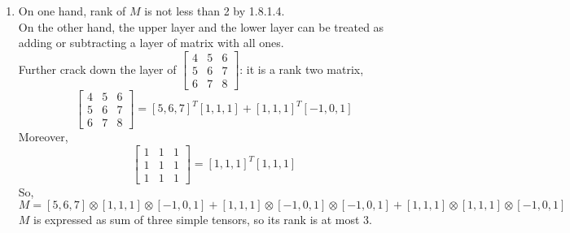 \documentclass{article}
\begin{document}
\begin{enumerate}
    \item 
    On one hand, rank of $M$ is not less than 2 by 1.8.1.4.\\
    On the other hand, the upper layer and the lower layer can be treated as adding or subtracting a layer of matrix with all ones. \\
    Further crack down the layer of 
    $\left[
    \begin{array}{ccc}
     4 & 5 & 6\\
     5 & 6 & 7\\
     6 & 7 & 8
    \end{array}
    \right]$: it is a rank two matrix, 
    \[\left[
    \begin{array}{ccc}
     4 & 5 & 6\\
     5 & 6 & 7\\
     6 & 7 & 8
    \end{array}
    \right] = [5,6,7]^T[1,1,1]+[1,1,1]^T[-1,0,1]\]
    Moreover, 
    \[\left[
    \begin{array}{ccc}
     1 & 1 & 1\\
     1 & 1 & 1\\
     1 & 1 & 1
    \end{array}
    \right] = [1,1,1]^T[1,1,1]\]
    So, 
    \[M = [5,6,7]\otimes[1,1,1]\otimes[-1,0,1] + [1,1,1]\otimes[-1,0,1]\otimes[-1,0,1] + [1,1,1]\otimes[1,1,1]\otimes[-1,0,1]\]
    $M$ is expressed as sum of three simple tensors, so its rank is at most 3.
\end{enumerate}
\end{document}
